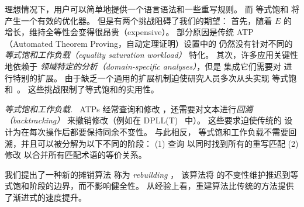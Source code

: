 理想情况下，用户可以简单地提供一个语言语法和一些重写规则。
  而 等式饱和 将产生一个有效的优化器。
但是有两个挑战阻碍了我们的期望：
首先，随着 $E$ 的增长，维持全等性会变得很昂贵（expensive）。
部分原因是传统 ATP（Automated Theorem Proving，自动定理证明）设置中的 \egraphs 
  仍然没有针对不同的 \textit{等式饱和工作负载（equality saturation workload）} 特化。
其次，许多应用关键性地依赖于 \textit{领域特定的分析（domain-specific analyses）}，但是
  集成它们需要对 \egraph 进行特别的扩展。
由于缺乏一个通用的扩展机制迫使研究人员多次从头实现
  等式饱和~\cite{herbie, eqsat, wu_siga19}。
这些挑战限制了等式饱和的实用性。

\textit{等式饱和工作负载. $\,$}
ATPs 经常查询和修改 \egraphs ，还需要对文本进行\textit{回溯（backtracking）}
  来撤销修改（例如在 DPLL(T)~\cite{dpll} 中）。
这些要求迫使传统的 \egraph 设计为在每次操作后都要保持同余不变性。
与此相反，
  等式饱和工作负载不需要回溯，并且可以被分解为以下不同的阶段：
  (1) 查询 \egraph 以同时找到所有的重写匹配
  (2) 修改 \egraph 以合并所有匹配术语的等价关系。

我们提出了一种新的摊销算法 %
  称为 \textit{rebuilding} ，
  该算法将 \egraph 的不变性维护推迟到等式饱和阶段的边界，而不影响健全性。
从经验上看，重建算法比传统的方法提供了渐进式的速度提升。

